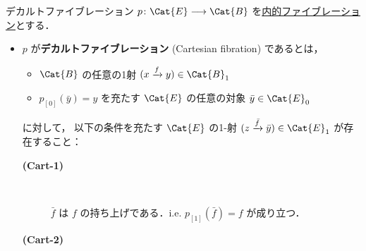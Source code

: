 \documentclass[TQFT_main]{subfiles}
\begin{document}
\begin{mydef}[label=def:Cart-coCart,breakable]{デカルトファイブレーション}
    $p \colon \Cat{E} \lto \Cat{B}$ を\hyperref[def:infty-fib]{内的ファイブレーション}とする．
    \begin{itemize}
        \item $p$ が\textbf{デカルトファイブレーション} (Cartesian fibration) であるとは，
        \begin{itemize}
            \item $\Cat{B}$ の任意の1射 $(x \xrightarrow{f} y) \in \Cat{B}_1$ 
            \item $p_{[0]}(\bar{y}) = y$ を充たす $\Cat{E}$ の任意の対象 $\bar{y} \in \Cat{E}_0$
        \end{itemize}
        に対して，
        以下の条件を充たす $\Cat{E}$ の1-射 $(z \xrightarrow{\bar{f}} \bar{y}) \in \Cat{E}_1$ が存在すること：
        \begin{description}
            \item[\textbf{(Cart-1)}]　
            
            $\bar{f}$ は $f$ の持ち上げである．i.e. $p_{[1]}(\bar{f}) = f$ が成り立つ．

            \item[\textbf{(Cart-2)}]　
            

\end{description}
\end{itemize}
\end{mydef}
\end{document}
